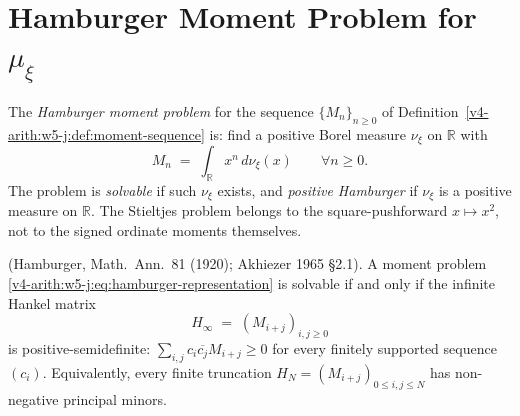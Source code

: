 \section{Hamburger Moment Problem for \(\mu_{\xi}\)}
\label{v4-arith:w5-j:SH-moment}

\begin{definition}
\label{v4-arith:w5-j:def:hamburger-problem}
The \emph{Hamburger moment problem} for
the sequence \(\{M_{n}\}_{n\geq 0}\) of
Definition~\ref{v4-arith:w5-j:def:moment-sequence} is: find a positive Borel
measure \(\nu_{\xi}\) on \(\mathbb{R}\) with
\begin{equation}
\label{v4-arith:w5-j:eq:hamburger-representation}
M_{n}\;=\;\int_{\mathbb{R}}x^{n}\,d\nu_{\xi}(x)\qquad\forall n\geq 0.
\end{equation}
The problem is \emph{solvable} if such \(\nu_{\xi}\) exists, and
\emph{positive Hamburger} if \(\nu_{\xi}\) is a positive measure on
\(\mathbb R\). The Stieltjes problem belongs to the square-pushforward
\(x\mapsto x^{2}\), not to the signed ordinate moments themselves.
\end{definition}

\begin{theorem}
\label{v4-arith:w5-j:thm:hamburger-existence}
\ClaimStatusProvedElsewhere (Hamburger, Math.~Ann.~81 (1920);
Akhiezer 1965 \S2.1). A moment problem
\eqref{v4-arith:w5-j:eq:hamburger-representation} is solvable if
and only if the infinite Hankel matrix
\[
H_{\infty}\;=\;(M_{i+j})_{i,j\geq 0}
\]
is positive-semidefinite:
\(\sum_{i,j}c_{i}\overline{c_{j}}M_{i+j}\geq 0\) for every finitely
supported sequence \((c_{i})\). Equivalently, every finite truncation
\(H_{N}=(M_{i+j})_{0\leq i,j\leq N}\) has non-negative principal
minors.
\end{theorem}

